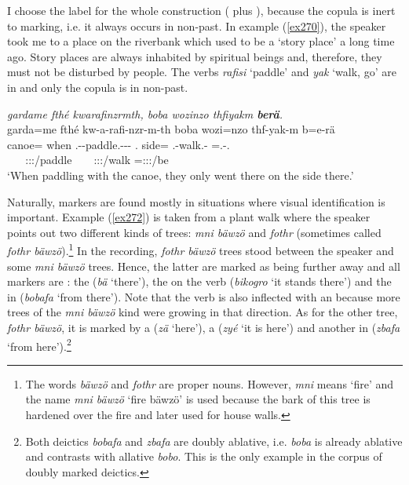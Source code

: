 I choose the label   for the whole construction (  plus ), because the copula is inert to  marking, i.e. it always occurs in non-past. In example (\ref{ex270}), the speaker took me to a place on the riverbank which used to be a `story place' a long time ago. Story places are always inhabited by spiritual beings and, therefore, they must not be disturbed by people. The verbs \emph{rafisi} `paddle' and \emph{yak} `walk, go' are in   and only the copula is in non-past.

\begin{exe}
	\ex \emph{gardame fthé kwarafinzrmth, boba wozinzo thfiyakm \textbf{berä}.}\\
	\glll garda=me fthé kw-a-rafi-nzr-m-th boba wozi=nzo{\fixgll} thf-yak-m b=e-rä\\
	canoe=\Ins{} when \M.\Betaone-\Vc-paddle.\Ext-\Ndu-\Dur-\Stnsg{} \Med.\Abl{} side=\Only{} \Stnsg.\Betatwo-walk.\Ext-\Dur{} \Med=\Stnsg.\Alph-\Cop.\Ndu\\
	~ ~ {\Stpl:\Sbj:\Pst:\Dur/paddle} ~ ~ {\Stpl:\Sbj:\Pst:\Dur/walk} \footnotesize{\Med=\Stpl:\Sbj:\Nonpast:\Ipfv/be}\\
	\trans `When paddling with the canoe, they only went there on the side there.'\\ 
	\label{ex270}
\end{exe}

Naturally,  markers are found mostly in situations where visual identification is important. Example (\ref{ex272}) is taken from a plant walk where the speaker points out two different kinds of trees: \emph{mni bäwzö} and \emph{fothr} (sometimes called \emph{fothr bäwzö}).\footnote{The words \emph{bäwzö} and \emph{fothr} are proper nouns. However, \emph{mni} means `fire' and the name \emph{mni bäwzö} `fire bäwzö' is used because the bark of this tree is hardened over the fire and later used for house walls.} In the recording, \emph{fothr bäwzö} trees stood between the speaker and some \emph{mni bäwzö} trees. Hence, the latter are marked as being further away and all  markers are : the  (\emph{bä} `there'), the  on the verb (\emph{bikogro} `it stands there') and the  in   (\emph{bobafa} `from there'). Note that the verb is also inflected with an  because more trees of the \emph{mni bäwzö} kind were growing in that direction. As for the other tree, \emph{fothr bäwzö}, it is marked by a   (\emph{zä} `here'), a    (\emph{zyé} `it is here') and another   in   (\emph{zbafa} `from here').\footnote{Both deictics \emph{bobafa} and \emph{zbafa} are doubly ablative, i.e. \emph{boba} is already ablative and contrasts with allative \emph{bobo}. This is the only example in the corpus of doubly marked deictics.}

